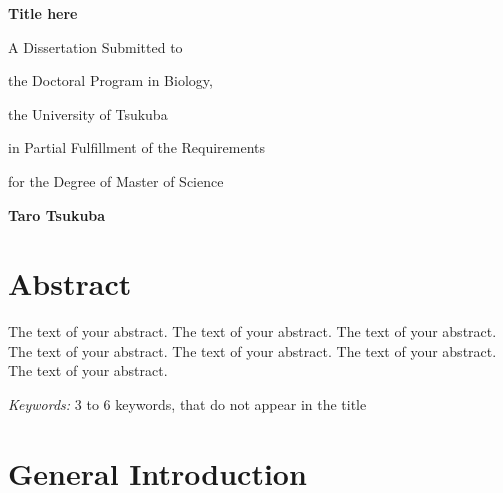 \documentclass[12pt, a4paper]{report} %
\begin{document}
\def\spacingset#1{\renewcommand{\baselinestretch}%
{#1}\small\normalsize} \spacingset{1}

    \thispagestyle{empty}
    \vspace*{30mm}
    \begin{center}
    \LARGE{\bf Title here}
    \end{center}

    \vspace{6cm}
    \centerline{A Dissertation Submitted to}\par
    \centerline{the Doctoral Program in Biology,}\par
    \centerline{the University of Tsukuba}\par
    \centerline{in Partial Fulfillment of the Requirements}\par
    \centerline{for the Degree of Master of Science}\par

    \vspace{2cm}
    \centerline{\Large{\bf Taro Tsukuba}}
    \clearpage


\newpage

\chapter*{Abstract}
The text of your abstract. The text of your abstract. The text of your
abstract. The text of your abstract. The text of your abstract. The text
of your abstract. The text of your abstract.

\noindent%
{\it Keywords:} 3 to 6 keywords, that do not appear in the title
\vfill

\newpage
\spacingset{1.45} %

\tableofcontents
{}
\newpage
\listoftables
{}
\newpage
\listoffigures
{}
\newpage

\chapter*{General Introduction}
 \parindent=5.3mm
\end{document}
